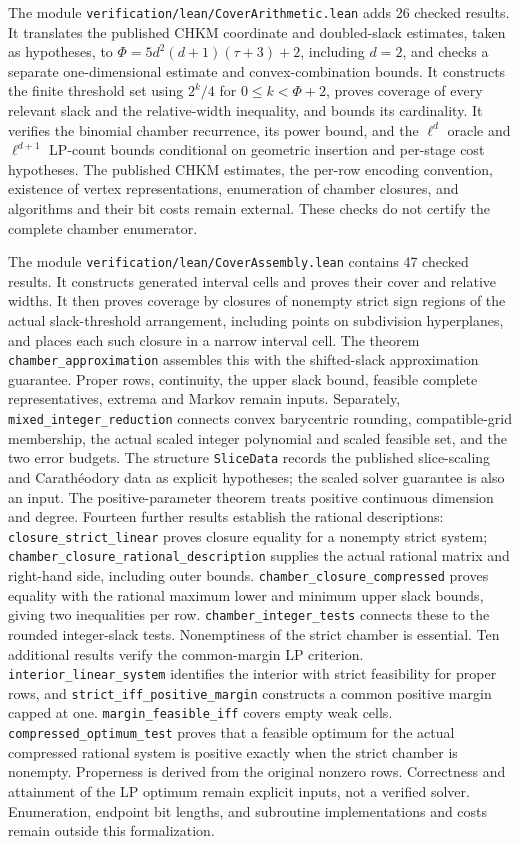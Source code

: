 \documentclass[11pt]{article}
\theoremstyle{definition}\newtheorem{definition}{Definition}[section]
\theoremstyle{remark}\newtheorem{remark}[theorem]{Remark}
\begin{document}
The module \texttt{verification/lean/CoverArithmetic.lean} adds 26 checked results. It translates the published CHKM coordinate and doubled-slack estimates, taken as hypotheses, to $\Phi=5d^2(d+1)(\tau+3)+2$, including $d=2$, and checks a separate one-dimensional estimate and convex-combination bounds. It constructs the finite threshold set using $2^k/4$ for $0\le k<\Phi+2$, proves coverage of every relevant slack and the relative-width inequality, and bounds its cardinality. It verifies the binomial chamber recurrence, its power bound, and the $\ell^d$ oracle and $\ell^{d+1}$ LP-count bounds conditional on geometric insertion and per-stage cost hypotheses. The published CHKM estimates, the per-row encoding convention, existence of vertex representations, enumeration of chamber closures, and algorithms and their bit costs remain external. These checks do not certify the complete chamber enumerator.

The module \texttt{verification/lean/CoverAssembly.lean} contains 47 checked results. It constructs generated interval cells and proves their cover and relative widths. It then proves coverage by closures of nonempty strict sign regions of the actual slack-threshold arrangement, including points on subdivision hyperplanes, and places each such closure in a narrow interval cell. The theorem \texttt{chamber\_approximation} assembles this with the shifted-slack approximation guarantee. Proper rows, continuity, the upper slack bound, feasible complete representatives, extrema and Markov remain inputs. Separately, \texttt{mixed\_integer\_reduction} connects convex barycentric rounding, compatible-grid membership, the actual scaled integer polynomial and scaled feasible set, and the two error budgets. The structure \texttt{SliceData} records the published slice-scaling and Carath\'eodory data as explicit hypotheses; the scaled solver guarantee is also an input. The positive-parameter theorem treats positive continuous dimension and degree. Fourteen further results establish the rational descriptions: \texttt{closure\_strict\_linear} proves closure equality for a nonempty strict system; \texttt{chamber\_closure\_rational\_description} supplies the actual rational matrix and right-hand side, including outer bounds. \texttt{chamber\_closure\_compressed} proves equality with the rational maximum lower and minimum upper slack bounds, giving two inequalities per row. \texttt{chamber\_integer\_tests} connects these to the rounded integer-slack tests. Nonemptiness of the strict chamber is essential. Ten additional results verify the common-margin LP criterion. \texttt{interior\_linear\_system} identifies the interior with strict feasibility for proper rows, and \texttt{strict\_iff\_positive\_margin} constructs a common positive margin capped at one. \texttt{margin\_feasible\_iff} covers empty weak cells. \texttt{compressed\_optimum\_test} proves that a feasible optimum for the actual compressed rational system is positive exactly when the strict chamber is nonempty. Properness is derived from the original nonzero rows. Correctness and attainment of the LP optimum remain explicit inputs, not a verified solver. Enumeration, endpoint bit lengths, and subroutine implementations and costs remain outside this formalization.
\end{document}
